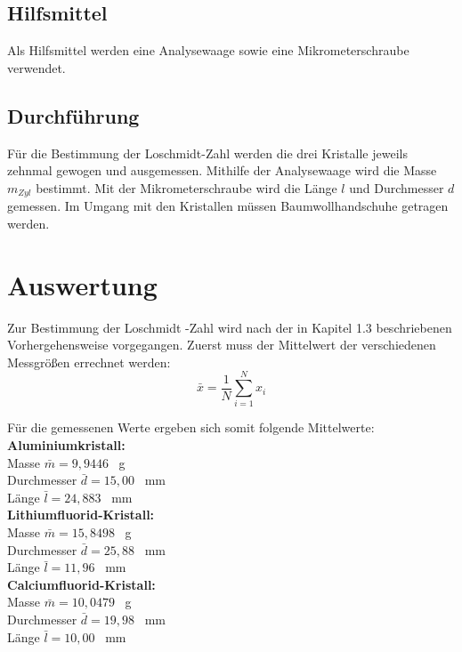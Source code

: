 \documentclass[12pt,a4paper,titlepage,headinclude,bibtotoc]{scrartcl}
\begin{document}
\subsection{Hilfsmittel}
Als Hilfsmittel werden eine Analysewaage sowie eine Mikrometerschraube verwendet.

\subsection{Durchführung}

Für die Bestimmung der Loschmidt-Zahl werden die drei Kristalle jeweils zehnmal gewogen und ausgemessen. Mithilfe der Analysewaage wird die Masse $m_{Zyl}$ bestimmt. Mit der Mikrometerschraube wird die Länge $l$ und Durchmesser $d$ gemessen. Im Umgang mit den Kristallen müssen Baumwollhandschuhe getragen werden. 

\newpage
\section{Auswertung}
Zur Bestimmung der Loschmidt -Zahl wird nach der in Kapitel 1.3 beschriebenen Vorhergehensweise vorgegangen. Zuerst muss der Mittelwert der verschiedenen Messgrößen errechnet werden:
\begin{equation}
\bar{x}=\frac{1}{N} \sum_{i=1}^N x_i
\end{equation}

Für die gemessenen Werte ergeben sich somit folgende Mittelwerte:\\

\vspace{3mm}
\textbf{Aluminiumkristall:}\\
Masse $\bar{m}=9,9446$ \ g \\
Durchmesser $\bar{d}=15,00$ \ mm \\
Länge $\bar{l}=24,883$ \ mm\\

\vspace{3mm}
\textbf{Lithiumfluorid-Kristall:}\\
Masse $\bar{m}=15,8498$ \ g \\
Durchmesser $\bar{d}=25,88$ \ mm \\
Länge $\bar{l}=11,96$ \ mm\\

\vspace{3mm}
\textbf{Calciumfluorid-Kristall:}\\
Masse $\bar{m}=10,0479$ \ g \\
Durchmesser $\bar{d}=19,98$ \ mm \\
Länge $\bar{l}=10,00$ \ mm\\
\end{document}
